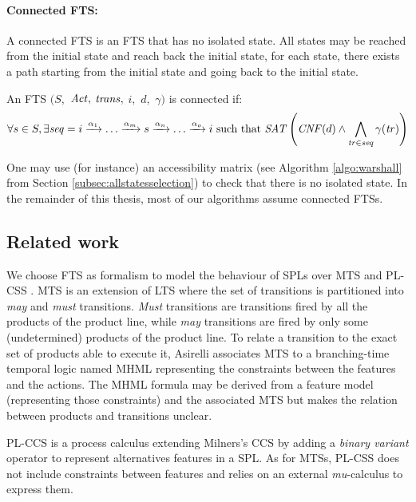 \paragraph{Connected FTS:}

A connected \gls{FTS} is an \gls{FTS} that has no isolated state. All states may be reached from the initial state and reach back the initial state, \ie for each state, there exists a path starting from the initial state and going back to the initial state.
%
\begin{property}
An \gls{FTS} $(S,$ $\mathit{Act},$ $\mathit{trans},$ $i,$ $d,$ $\gamma)$ is connected if:
$$
\forall s \in S, \exists \mathit{seq} = i \xrightarrow{\alpha_1} \ldots \xrightarrow{\alpha_m} s \xrightarrow{\alpha_n} \ldots \xrightarrow{\alpha_o} i \text{ such that } \mathit{SAT}\left( \mathit{CNF}(d) \wedge \bigwedge_{\mathit{tr} \in \mathit{seq}} \gamma(\mathit{tr}) \right)
$$
\end{property}
%
One may use (for instance) an accessibility matrix (see Algorithm \ref{algo:warshall} from Section \ref{subsec:allstatesselection}) to check that there is no isolated state. In the remainder of this thesis, most of our algorithms assume connected \glspl{FTS}.

\subsection{Related work}

We choose \gls{FTS} as formalism to model the behaviour of \glspl{SPL} over \gls{MTS} \cite{Fischbein2006} and PL-CSS \cite{Gruler2008}. \gls{MTS} is an extension of \gls{LTS} where the set of transitions is partitioned into \textit{may} and \textit{must} transitions. \textit{Must} transitions are transitions fired by all the products of the product line, while \textit{may} transitions are fired by only some (undetermined) products of the product line. To relate a transition to the exact set of products able to execute it, Asirelli \etal \cite{Asirelli2012,Asirelli2011b,Asirelli2011a} associates \gls{MTS} to a branching-time temporal logic named \gls{MHML} representing the constraints between the features and the actions. The \gls{MHML} formula may be derived from a feature model (representing those constraints) and the associated \gls{MTS} but makes the relation between products and transitions unclear.

\gls{PL-CCS} \cite{Gruler2008} is a process calculus extending Milners's \gls{CCS} \cite{Milner1982} by adding a \textit{binary variant} operator to represent alternatives features in a \gls{SPL}. As for \glspl{MTS}, PL-CSS does not include constraints between features and relies on an external \textit{mu}-calculus \cite{Shoham2012} to express them.

